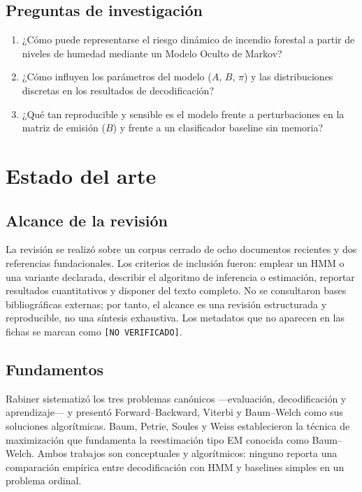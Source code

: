 \documentclass[11pt,letterpaper]{article}
\begin{document}
\subsection{Preguntas de investigación}

\begin{enumerate}[label=\textbf{P\arabic*.}]
  \item ¿Cómo puede representarse el riesgo dinámico de incendio forestal a partir de niveles de humedad mediante un Modelo Oculto de Markov?
  \item ¿Cómo influyen los parámetros del modelo (\(A\), \(B\), \(\pi\)) y las distribuciones discretas en los resultados de decodificación?
  \item ¿Qué tan reproducible y sensible es el modelo frente a perturbaciones en la matriz de emisión (\(B\)) y frente a un clasificador baseline sin memoria?
\end{enumerate}

\section{Estado del arte}

\subsection{Alcance de la revisión}

La revisión se realizó sobre un corpus cerrado de ocho documentos recientes y dos referencias fundacionales. Los criterios de inclusión fueron: emplear un HMM o una variante declarada, describir el algoritmo de inferencia o estimación, reportar resultados cuantitativos y disponer del texto completo. No se consultaron bases bibliográficas externas; por tanto, el alcance es una revisión estructurada y reproducible, no una síntesis exhaustiva. Los metadatos que no aparecen en las fichas se marcan como \texttt{[NO VERIFICADO]}.

\subsection{Fundamentos}

Rabiner \cite{rabiner1989} sistematizó los tres problemas canónicos ---evaluación, decodificación y aprendizaje--- y presentó Forward--Backward, Viterbi y Baum--Welch como sus soluciones algorítmicas. Baum, Petrie, Soules y Weiss \cite{baum1970} establecieron la técnica de maximización que fundamenta la reestimación tipo EM conocida como Baum--Welch. Ambos trabajos son conceptuales y algorítmicos: ninguno reporta una comparación empírica entre decodificación con HMM y baselines simples en un problema ordinal.
\end{document}
